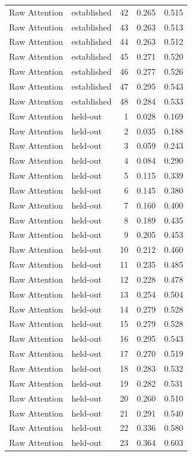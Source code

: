 \begin{tabular}{llrrr}
Raw Attention & established & 42 & 0.265 & 0.515 \\
Raw Attention & established & 43 & 0.263 & 0.513 \\
Raw Attention & established & 44 & 0.263 & 0.512 \\
Raw Attention & established & 45 & 0.271 & 0.520 \\
Raw Attention & established & 46 & 0.277 & 0.526 \\
Raw Attention & established & 47 & 0.295 & 0.543 \\
Raw Attention & established & 48 & 0.284 & 0.533 \\
Raw Attention & held-out & 1 & 0.028 & 0.169 \\
Raw Attention & held-out & 2 & 0.035 & 0.188 \\
Raw Attention & held-out & 3 & 0.059 & 0.243 \\
Raw Attention & held-out & 4 & 0.084 & 0.290 \\
Raw Attention & held-out & 5 & 0.115 & 0.339 \\
Raw Attention & held-out & 6 & 0.145 & 0.380 \\
Raw Attention & held-out & 7 & 0.160 & 0.400 \\
Raw Attention & held-out & 8 & 0.189 & 0.435 \\
Raw Attention & held-out & 9 & 0.205 & 0.453 \\
Raw Attention & held-out & 10 & 0.212 & 0.460 \\
Raw Attention & held-out & 11 & 0.235 & 0.485 \\
Raw Attention & held-out & 12 & 0.228 & 0.478 \\
Raw Attention & held-out & 13 & 0.254 & 0.504 \\
Raw Attention & held-out & 14 & 0.279 & 0.528 \\
Raw Attention & held-out & 15 & 0.279 & 0.528 \\
Raw Attention & held-out & 16 & 0.295 & 0.543 \\
Raw Attention & held-out & 17 & 0.270 & 0.519 \\
Raw Attention & held-out & 18 & 0.283 & 0.532 \\
Raw Attention & held-out & 19 & 0.282 & 0.531 \\
Raw Attention & held-out & 20 & 0.260 & 0.510 \\
Raw Attention & held-out & 21 & 0.291 & 0.540 \\
Raw Attention & held-out & 22 & 0.336 & 0.580 \\
Raw Attention & held-out & 23 & 0.364 & 0.603 \\

\end{tabular}
